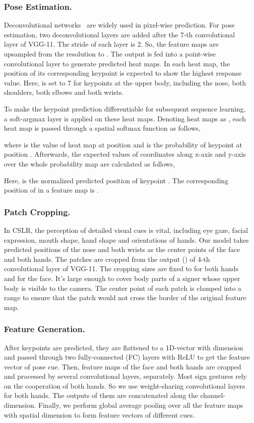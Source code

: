 \documentclass[letterpaper]{article} \usepackage{aaai20}  \usepackage{times}  \usepackage{helvet} \usepackage{courier}  \usepackage[hyphens]{url}  \usepackage{graphicx} \urlstyle{rm} \def\UrlFont{\rm}  \usepackage{graphicx}  \frenchspacing  \setlength{\pdfpagewidth}{8.5in}  \setlength{\pdfpageheight}{11in}
\begin{document}
\subsubsection{Pose Estimation.}
Deconvolutional networks~\cite{deconv} are widely used in pixel-wise prediction. For pose estimation, two deconvolutional layers are added after the 7-th convolutional layer of VGG-11. The stride of each layer is 2. So, the feature maps are  upsampled from the resolution  to . The output is fed into a point-wise convolutional layer to generate  predicted heat maps. In each heat map, the position of its corresponding keypoint is expected to show the highest response value. Here,  is set to 7 for keypoints at the upper body, including the nose, both shoulders, both elbows and both wrists. 

To make the keypoint prediction differentiable for subsequent sequence learning, a soft-argmax layer is applied on these heat maps. Denoting  heat maps as  , each heat map  is passed through a spatial softmax function as follows, 

where  is the value of heat map  at position  and  is the probability of keypoint  at position . Afterwards, the expected values of coordinates along x-axis and y-axis over the whole probability map are calculated as follows,

Here,  is the normalized predicted position of keypoint . The corresponding position of  in a  feature map is .

\subsubsection{Patch Cropping.}
In CSLR, the perception of detailed visual cues is vital, including eye gaze, facial expression, mouth shape, hand shape and orientations of hands. 
Our model takes predicted positions of the nose and both wrists as the center points of the face and both hands. 
The patches are cropped from the output () of 4-th convolutional layer of VGG-11. The cropping sizes are fixed to  for both hands and  for the face. It's large enough to cover body parts of a signer whose upper body is visible to the camera. The center point of each patch is clamped into a range to ensure that the patch would not cross the border of the original feature map.


\subsubsection{Feature Generation.}
After  keypoints are predicted, they are flattened to a 1D-vector with dimension  and passed through two fully-connected (FC) layers with ReLU to get the feature vector of pose cue. Then, feature maps of the face and both hands are cropped and processed by several convolutional layers, separately. Most sign gestures rely on the cooperation of both hands. So we use weight-sharing convolutional layers for both hands. The outputs of them are concatenated along the channel-dimension. Finally, we perform global average pooling over all the feature maps with spatial dimension to form feature vectors of different cues.
\end{document}
